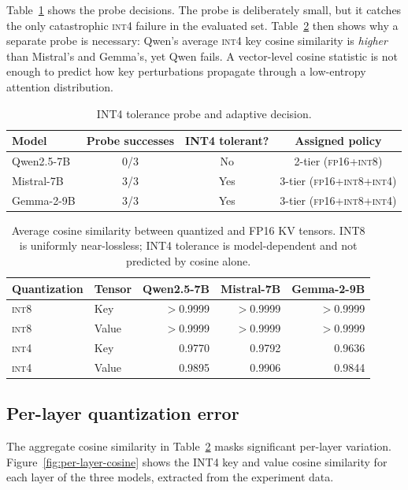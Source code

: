 \documentclass[11pt]{article}
\newcommand{\fp}{\textsc{fp16}}
\newcommand{\intviii}{\textsc{int8}}
\newcommand{\intiv}{\textsc{int4}}
\theoremstyle{plain}
\theoremstyle{definition}
\begin{document}
Table~\ref{tab:probe} shows the probe decisions.  The probe is deliberately small, but it catches the only catastrophic \intiv{} failure in the evaluated set.  Table~\ref{tab:cosine} then shows why a separate probe is necessary: Qwen's average \intiv{} key cosine similarity is \emph{higher} than Mistral's and Gemma's, yet Qwen fails.  A vector-level cosine statistic is not enough to predict how key perturbations propagate through a low-entropy attention distribution.

\begin{table}[t]
\centering
\caption{INT4 tolerance probe and adaptive decision.}
\label{tab:probe}
\small
\begin{tabular}{lccc}
\toprule
Model & Probe successes & INT4 tolerant? & Assigned policy \\
\midrule
Qwen2.5-7B & 0/3 & No & 2-tier (\fp{}+\intviii{}) \\
Mistral-7B & 3/3 & Yes & 3-tier (\fp{}+\intviii{}+\intiv{}) \\
Gemma-2-9B & 3/3 & Yes & 3-tier (\fp{}+\intviii{}+\intiv{}) \\
\bottomrule
\end{tabular}
\end{table}

\begin{table}[t]
\centering
\caption{Average cosine similarity between quantized and FP16 KV tensors.  INT8 is uniformly near-lossless; INT4 tolerance is model-dependent and not predicted by cosine alone.}
\label{tab:cosine}
\small
\begin{tabular}{llrrr}
\toprule
Quantization & Tensor & Qwen2.5-7B & Mistral-7B & Gemma-2-9B \\
\midrule
\intviii{} & Key & $>$0.9999 & $>$0.9999 & $>$0.9999 \\
\intviii{} & Value & $>$0.9999 & $>$0.9999 & $>$0.9999 \\
\intiv{} & Key & 0.9770 & 0.9792 & 0.9636 \\
\intiv{} & Value & 0.9895 & 0.9906 & 0.9844 \\
\bottomrule
\end{tabular}
\end{table}

\subsection{Per-layer quantization error}
\label{sec:per-layer-quant}

The aggregate cosine similarity in Table~\ref{tab:cosine} masks significant per-layer variation.  Figure~\ref{fig:per-layer-cosine} shows the INT4 key and value cosine similarity for each layer of the three models, extracted from the experiment data.
\end{document}
